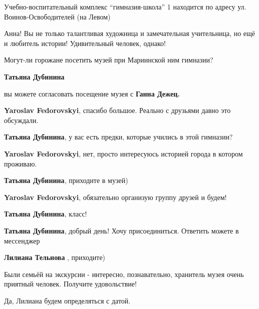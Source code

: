  
 
 
 
 

\qqSecCmt


Учебно-воспитательный комплекс \enquote{гимназия-школа} 1 находится по адресу
ул. Воинов-Освободителей (на Левом)


Анна! Вы не только талантливая художница и замечательная учительница, но ещё и
любитель истории! Удивительный человек, однако!


Могут-ли горожане посетить музей при Мариинской ним
гимназии?

\begin{itemize} %
\textbf{Татьяна Дубинина}

вы можете согласовать посещение музея с \textbf{Ганна Дежец.}

\begin{itemize} %
\textbf{Yaroslav Fedorovskyi}, спасибо большое. Реально с друзьями давно это обсуждали.

\textbf{Татьяна Дубинина}, у вас есть предки, которые учились в этой гимназии?

\textbf{Yaroslav Fedorovskyi}, нет, просто интересуюсь историей города в котором проживаю.

\textbf{Татьяна Дубинина}, приходите в музей)

\textbf{Yaroslav Fedorovskyi}, обязательно организую группу друзей и будем!

\textbf{Татьяна Дубинина}, класс!

\textbf{Татьяна Дубинина}, добрый день! Хочу присоединиться. Ответить можете в мессенджер

\textbf{Лилиана Тельнова} , приходите)


Были семьёй на экскурсии - интересно, познавательно, хранитель музея очень
приятный человек. Получите удовольствие!

\end{itemize} %


Да, Лилиана будем определяться с датой.

\end{itemize} %

